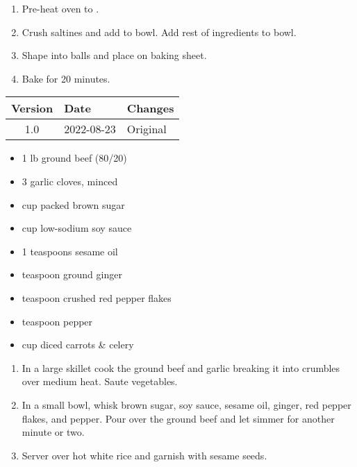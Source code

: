 \instructions
\begin{enumerate}
    \item Pre-heat oven to .
    \item Crush saltines and add to bowl. Add rest of ingredients to bowl.
    \item Shape into balls and place on baking sheet.
    \item Bake for 20 minutes.
\end{enumerate}

\vfill

\begin{tabular}{ c | l | l }
  \textbf{Version} & \textbf{Date} & \textbf{Changes} \\ 
  \hline		
  1.0 & 2022-08-23 & Original \\
\end{tabular}



\ingredients
\begin{multicols}{2}
\raggedcolumns %
\begin{itemize}
    \item 1 lb ground beef (80/20)
    \item 3 garlic cloves, minced
    \item {} cup packed brown sugar
    \item {} cup low-sodium soy sauce
    \item 1 teaspoons sesame oil
    \item {} teaspoon ground ginger
    \item {} teaspoon crushed red pepper flakes
    \item {} teaspoon pepper
    \item {} cup diced carrots \& celery
\end{itemize}
\end{multicols}

\instructions
\begin{enumerate}
    \item In a large skillet cook the ground beef and garlic breaking it into crumbles over medium heat. Saute vegetables.
    \item In a small bowl, whisk brown sugar, soy sauce, sesame oil, ginger, red pepper flakes, and pepper. Pour over the ground beef and let simmer for another minute or two.
    \item Server over hot white rice and garnish with sesame seeds.
\end{enumerate}

